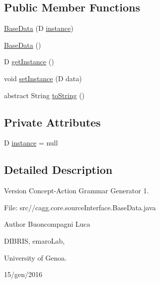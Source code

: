 \subsection*{Public Member Functions}
\begin{DoxyCompactItemize}
\item 
\hyperlink{classit_1_1emarolab_1_1cagg_1_1core_1_1language_1_1BaseData_3_01D_01_4_a920e2842d8997ffc6a8a4a00c3dc62a8}{Base\-Data} (D \hyperlink{classit_1_1emarolab_1_1cagg_1_1core_1_1language_1_1BaseData_3_01D_01_4_a1f5fb28e06552521a35197bbe682097f}{instance})
\item 
\hyperlink{classit_1_1emarolab_1_1cagg_1_1core_1_1language_1_1BaseData_3_01D_01_4_afeda0d18e5386eac2974a58a1a79c136}{Base\-Data} ()
\item 
D \hyperlink{classit_1_1emarolab_1_1cagg_1_1core_1_1language_1_1BaseData_3_01D_01_4_abb19a8b413efee9dacbcde1779aae981}{get\-Instance} ()
\item 
void \hyperlink{classit_1_1emarolab_1_1cagg_1_1core_1_1language_1_1BaseData_3_01D_01_4_a2e80e46930e2f181e879c2c773735e7a}{set\-Instance} (D data)
\item 
abstract String \hyperlink{classit_1_1emarolab_1_1cagg_1_1core_1_1language_1_1BaseData_3_01D_01_4_a726b91f7a80ac199b680bfd840b6b9ce}{to\-String} ()
\end{DoxyCompactItemize}
\subsection*{Private Attributes}
\begin{DoxyCompactItemize}
\item 
D \hyperlink{classit_1_1emarolab_1_1cagg_1_1core_1_1language_1_1BaseData_3_01D_01_4_a1f5fb28e06552521a35197bbe682097f}{instance} = null
\end{DoxyCompactItemize}


\subsection{Detailed Description}
\begin{DoxyVersion}{Version}
Concept-\/\-Action Grammar Generator 1. \par
 File\-: src//cagg.core.\-source\-Interface.\-Base\-Data.\-java \par

\end{DoxyVersion}
\begin{DoxyAuthor}{Author}
Buoncompagni Luca \par
 D\-I\-B\-R\-I\-S, emaro\-Lab,\par
 University of Genoa. \par
 15/gen/2016 \par

\end{DoxyAuthor}


